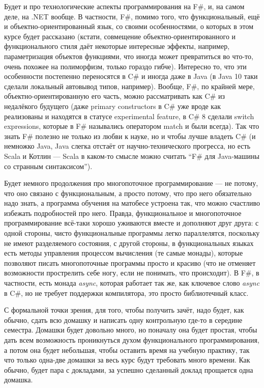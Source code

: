 \documentclass[a5paper]{article}
\begin{document}
Будет и про технологические аспекты программирования на F\#, и, на самом деле, на .NET вообще. В частности, F\#, помимо того, что функциональный, ещё и объектно-ориентированный язык, со своими особенностями, о которых в этом курсе будет рассказано (кстати, совмещение объектно-ориентированного и функционального стиля даёт некоторые интересные эффекты, например, параметризация объектов функциями, что иногда может превратиться во что-то, очень похожее на полиморфизм, только гораздо гибче). Интересно то, что эти особенности постепенно переносятся в C\# и иногда даже в Java (в Java 10 таки сделали локальный автовывод типов, например). Вообще, F\#, по крайней мере, объектно-ориентированную его часть, можно рассматривать как C\# из недалёкого будущего (даже primary constructors в C\# уже вроде как реализованы и находятся в статусе experimental feature, в C\# 8 сделали switch expressions, которые в F\# назывались оператором match и были всегда). Так что знать F\# полезно не только из любви к науке, но и чтобы лучше владеть C\# (и немножко Java, Java слегка отстаёт от научно-технического прогресса, но есть Scala и Котлин --- Scala в каком-то смысле можно считать ``F\# для Java-машины со странным синтаксисом'').

Будет немного продолжения про многопоточное программирование --- не потому, что оно связано с функциональным, а просто потому, что про него обязательно надо знать, а программа обучения на матобесе устроена так, что можно счастливо избежать подробностей про него. Правда, функциональное и многопоточное программирование всё-таки хорошо уживаются вместе и дополняют друг друга: с одной стороны, чисто функциональные программы легко параллелятся, поскольку не имеют разделяемого состояния, с другой стороны, в функциональных языках есть методы управления процессом вычисления (те самые монады), которые позволяют писать многопоточные программы просто и красиво (что не отменяет возможности прострелить себе ногу, если не понимать, что происходит). В F\#, в частности, есть монада \textit{async}, которая работает так же, как ключевое слово \textit{async} в C\#, но не требует поддержки компилятора, это просто библиотечный класс.

С формальной точки зрения, для того, чтобы получить зачёт, надо будет, как обычно, сдать всю домашку и написать одну контрольную где-то в середине семестра. Домашки будет довольно много, но поначалу она будет простая, чтобы дать всем возможность проникнуться духом функционального программирования, а потом она будет небольшая, чтобы оставить время на учебную практику, так что только одна-две домашки за весь курс будут требовать много времени. Как обычно, будет пара с докладами, за успешно сделанный доклад прощается одна домашка.
\end{document}
